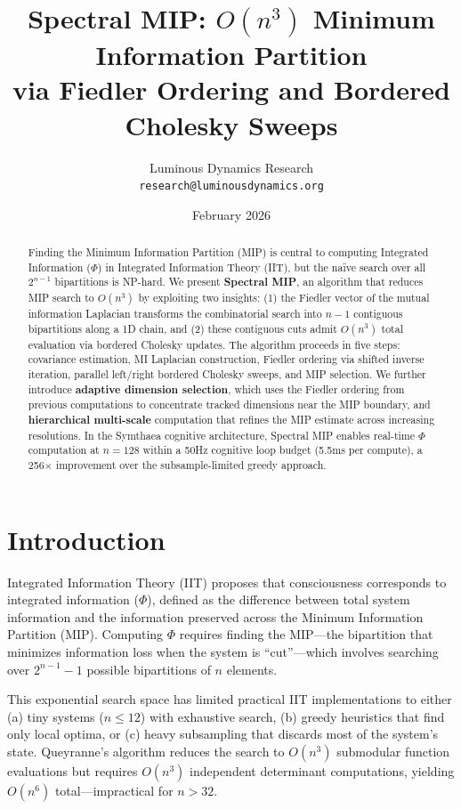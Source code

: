 \documentclass[10pt,letterpaper]{article}
\title{Spectral MIP: $O(n^3)$ Minimum Information Partition\\
via Fiedler Ordering and Bordered Cholesky Sweeps}
\author{
  Luminous Dynamics Research \\
  \texttt{research@luminousdynamics.org}
}
\date{February 2026}
\begin{document}
\maketitle

\begin{abstract}
Finding the Minimum Information Partition (MIP) is central to computing Integrated Information ($\Phi$) in Integrated Information Theory (IIT), but the na\"ive search over all $2^{n-1}$ bipartitions is NP-hard. We present \textbf{Spectral MIP}, an algorithm that reduces MIP search to $O(n^3)$ by exploiting two insights: (1) the Fiedler vector of the mutual information Laplacian transforms the combinatorial search into $n-1$ contiguous bipartitions along a 1D chain, and (2) these contiguous cuts admit $O(n^3)$ total evaluation via bordered Cholesky updates. The algorithm proceeds in five steps: covariance estimation, MI Laplacian construction, Fiedler ordering via shifted inverse iteration, parallel left/right bordered Cholesky sweeps, and MIP selection. We further introduce \textbf{adaptive dimension selection}, which uses the Fiedler ordering from previous computations to concentrate tracked dimensions near the MIP boundary, and \textbf{hierarchical multi-scale} computation that refines the MIP estimate across increasing resolutions. In the Symthaea cognitive architecture, Spectral MIP enables real-time $\Phi$ computation at $n=128$ within a 50Hz cognitive loop budget (5.5ms per compute), a 256$\times$ improvement over the subsample-limited greedy approach.
\end{abstract}

\section{Introduction}

Integrated Information Theory (IIT) \citep{tononi2004,oizumi2014} proposes that consciousness corresponds to integrated information ($\Phi$), defined as the difference between total system information and the information preserved across the Minimum Information Partition (MIP). Computing $\Phi$ requires finding the MIP---the bipartition that minimizes information loss when the system is ``cut''---which involves searching over $2^{n-1} - 1$ possible bipartitions of $n$ elements.

This exponential search space has limited practical IIT implementations to either (a) tiny systems ($n \leq 12$) with exhaustive search, (b) greedy heuristics that find only local optima, or (c) heavy subsampling that discards most of the system's state. Queyranne's algorithm \citep{queyranne1998} reduces the search to $O(n^3)$ submodular function evaluations but requires $O(n^3)$ independent determinant computations, yielding $O(n^6)$ total---impractical for $n > 32$.
\end{document}
